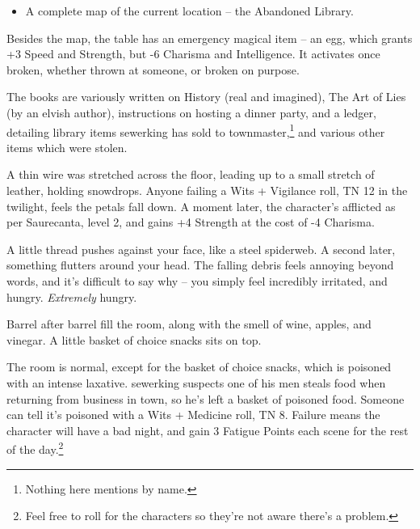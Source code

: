 \begin{multicols}{2}
\begin{itemize}
	\item{A complete map of the current location -- the Abandoned Library.}

\end{itemize}

Besides the map, the table has an emergency magical item -- an egg, which grants +3 Speed and Strength, but -6 Charisma and Intelligence.
It activates once broken, whether thrown at someone, or broken on purpose.

The books are variously written on History (real and imagined), The Art of Lies (by an elvish author), instructions on hosting a dinner party, and a ledger, detailing library items \gls{sewerking} has sold to \gls{townmaster},\footnote{Nothing here mentions  by name.} and various other items which were stolen.


A thin wire was stretched across the floor, leading up to a small stretch of leather, holding snowdrops.  Anyone failing a Wits + Vigilance roll, TN 12 in the twilight, feels the petals fall down.  A moment later, the character's afflicted as per Saurecanta, level 2, and gains +4 Strength at the cost of -4 Charisma.

\begin{boxtext}

	A little thread pushes against your face, like a steel spiderweb.
	A second later, something flutters around your head.
	The falling debris feels annoying beyond words, and it's difficult to say why -- you simply feel incredibly irritated, and hungry.
	\emph{Extremely} hungry.

\end{boxtext}


\begin{boxtext}

	Barrel after barrel fill the room, along with the smell of wine, apples, and vinegar.  A little basket of choice snacks sits on top.

\end{boxtext}

The room is normal, except for the basket of choice snacks, which is poisoned with an intense laxative.  \Gls{sewerking} suspects one of his men steals food when returning from business in town, so he's left a basket of poisoned food.  Someone can tell it's poisoned with a Wits + Medicine roll, TN 8.  Failure means the character will have a bad night, and gain 3 Fatigue Points each scene for the rest of the day.\footnote{Feel free to roll for the characters so they're not aware there's a problem.}


\end{multicols}
